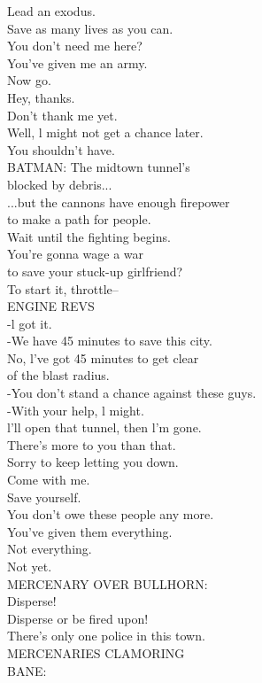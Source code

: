\documentclass{article}
\begin{document}
\begin{multicols}{3}
Lead an exodus.\\
Save as many lives as you can.\\
You don't need me here?\\
You've given me an army.\\
Now go.\\
Hey, thanks.\\
Don't thank me yet.\\
Well, l might not get a chance later.\\
You shouldn't have.\\
BATMAN: The midtown tunnel's\\
blocked by debris...\\
...but the cannons have enough firepower\\
to make a path for people.\\
Wait until the fighting begins.\\
You're gonna wage a war\\
to save your stuck-up girlfriend?\\
To start it, throttle--\\
ENGINE REVS\\
-l got it.\\
-We have 45 minutes to save this city.\\
No, l've got 45 minutes to get clear\\
of the blast radius.\\
-You don't stand a chance against these guys.\\
-With your help, l might.\\
l'll open that tunnel, then l'm gone.\\
There's more to you than that.\\
Sorry to keep letting you down.\\
Come with me.\\
Save yourself.\\
You don't owe these people any more.\\
You've given them everything.\\
Not everything.\\
Not yet.\\
MERCENARY OVER BULLHORN:\\
Disperse!\\
Disperse or be fired upon!\\
There's only one police in this town.\\
MERCENARIES CLAMORING\\
BANE:\\

\end{multicols}
\end{document}
